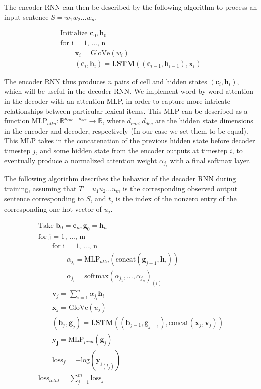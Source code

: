 \documentclass[a4paper, 12pt]{article}
\theoremstyle{definition}
\begin{document}
The encoder RNN can then be described by the following algorithm to process an input sentence $S = w_1w_2...w_n$.

\begin{gather}
\text{Initialize } \mathbf{c}_0, \mathbf{h}_0 \\
\text{for i = 1, ..., n } \\
	\qquad \mathbf{x}_i = \text{GloVe}(w_i)  \\
	\qquad (\mathbf{c}_{i}, \mathbf{h}_{i}) = \textbf{LSTM}((\mathbf{c}_{i-1}, \mathbf{h}_{i-1}), \mathbf{x}_{i}) 
\end{gather}

The encoder RNN thus produces $n$ pairs of cell and hidden states $(\mathbf{c}_i, \mathbf{h}_i)$, which will be useful in the decoder RNN. We implement word-by-word attention in the decoder with an attention MLP, in order to capture more intricate relationships between particular lexical items. This MLP can be described as a function $\text{MLP}_{attn} : \mathbb{R}^{d_{enc} + d_{dec}} \to \mathbb{R}$, where $d_{enc}, d_{dec}$ are the hidden state dimensions in the encoder and decoder, respectively (In our case we set them to be equal). This MLP takes in the concatenation of the previous hidden state before decoder timestep $j$, and some hidden state from the encoder outputs at timestep $i$, to eventually produce a normalized attention weight $\alpha_{j_{i}}$ with a final softmax layer. 

\bigskip

 The following algorithm describes the behavior of the decoder RNN during training, assuming that $T = u_1u_2...u_m$ is the corresponding observed output sentence corresponding to $S$, and $t_j$ is the index of the nonzero entry of the corresponding one-hot vector of $u_j$.

\begin{gather}
\text{Take } \mathbf{b}_0 = \mathbf{c}_n, \mathbf{g}_0 = \mathbf{h}_n \\
\text{for j = 1, ..., m} \\
	\qquad\text{for i = 1, ..., n} \\
		\qquad\qquad \bar{\alpha_{j_{i}}} = \text{MLP}_{attn}(\text{concat}(\mathbf{g}_{j-1},\mathbf{h}_i))\\
		\qquad\qquad \alpha_{j_{i}} = \text{softmax}(\bar{\alpha_{j_{1}}}, ..., \bar{\alpha_{j_{n}}})_{(i)} \\
	\qquad \mathbf{v}_j = \sum_{i = 1}^{n}\alpha_{j_{i}}\mathbf{h}_i \\
	\qquad \mathbf{x}_j = \text{GloVe}(u_j)  \\
	\qquad (\mathbf{b}_{j}, \mathbf{g}_{j}) = \textbf{LSTM}((\mathbf{b}_{j-1}, \mathbf{g}_{j-1}), \text{concat}(\mathbf{x}_{j}, \mathbf{v}_j)) \\
	\qquad\mathbf{y_j} = \text{MLP}_{pred}(\mathbf{g}_j) \\
	\qquad\text{loss}_j = -\text{log}(\mathbf{y_j}_{(t_j)}) \\
\text{loss}_{total} = \sum_{j=1}^{m}\text{loss}_j
\end{gather}
\end{document}
